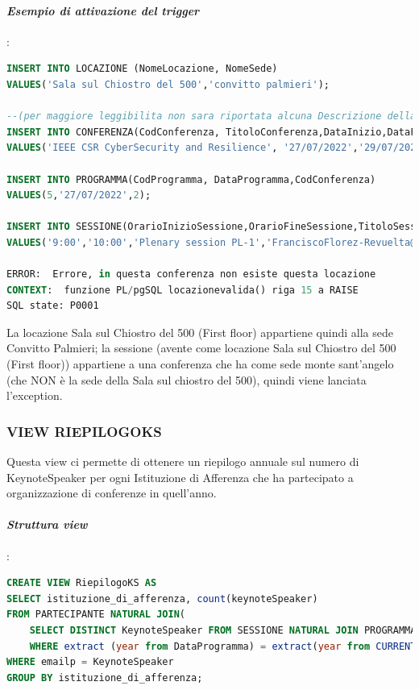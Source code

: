 \documentclass[a4page]{article}
\begin{document}
\paragraph{\textit{Esempio di attivazione del trigger}}:
\begin{lstlisting}[language=SQL,
        deletekeywords={IDENTITY,INT},
        morekeywords={clustered},    
        framesep=10pt,
        framextopmargin=10pt]
INSERT INTO LOCAZIONE (NomeLocazione, NomeSede)
VALUES('Sala sul Chiostro del 500','convitto palmieri');

--(per maggiore leggibilita non sara riportata alcuna Descrizione della conferenza).
INSERT INTO CONFERENZA(CodConferenza, TitoloConferenza,DataInizio,DataFine,Descrizione,NomeSede)
VALUES('IEEE CSR CyberSecurity and Resilience', '27/07/2022','29/07/2022','.','monte sant''angelo');

INSERT INTO PROGRAMMA(CodProgramma, DataProgramma,CodConferenza)
VALUES(5,'27/07/2022',2);

INSERT INTO SESSIONE(OrarioInizioSessione,OrarioFineSessione,TitoloSessione,Chair,CodProgramma,NomeLocazione)
VALUES('9:00','10:00','Plenary session PL-1','FranciscoFlorez-Revuelta@gmail.com',5,'Sala sul Chiostro del 500 (First floor)');

ERROR:  Errore, in questa conferenza non esiste questa locazione
CONTEXT:  funzione PL/pgSQL locazionevalida() riga 15 a RAISE
SQL state: P0001        
\end{lstlisting}
La locazione Sala sul Chiostro del 500 (First floor) appartiene quindi alla sede Convitto Palmieri; la sessione (avente come locazione Sala sul Chiostro del 500 (First floor)) appartiene a una conferenza che ha come sede monte sant'angelo (che NON è la sede della Sala sul chiostro del 500), quindi viene lanciata l'exception.	
\subsubsection{VIEW RIEPILOGOKS}
Questa view ci permette di ottenere un riepilogo annuale sul numero di KeynoteSpeaker per ogni Istituzione di Afferenza che ha partecipato a organizzazione di conferenze in quell'anno.
\vspace{1cm}
\paragraph{\textit{Struttura view}}:
\begin{lstlisting}[language=SQL,
        deletekeywords={IDENTITY,INT},
        morekeywords={clustered},    
        framesep=10pt,
        framextopmargin=10pt]
CREATE VIEW RiepilogoKS AS
SELECT istituzione_di_afferenza, count(keynoteSpeaker) 
FROM PARTECIPANTE NATURAL JOIN(
	SELECT DISTINCT KeynoteSpeaker FROM SESSIONE NATURAL JOIN PROGRAMMA  --seleziono in modo distinto tutti i KS dell'anno
	WHERE extract (year from DataProgramma) = extract(year from CURRENT_DATE)) AS T
WHERE emailp = KeynoteSpeaker
GROUP BY istituzione_di_afferenza;        
\end{lstlisting}
\end{document}
